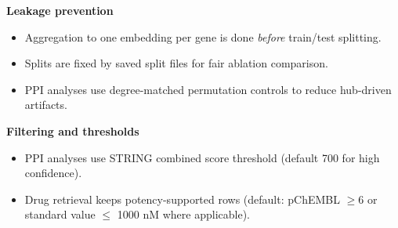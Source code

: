\documentclass{article}
\begin{document}
\textbf{Leakage prevention}
\begin{itemize}
    \item Aggregation to one embedding per gene is done \emph{before} train/test splitting.
    \item Splits are fixed by saved split files for fair ablation comparison.
    \item PPI analyses use degree-matched permutation controls to reduce hub-driven artifacts.
\end{itemize}

\textbf{Filtering and thresholds}
\begin{itemize}
    \item PPI analyses use STRING combined score threshold (default 700 for high confidence).
    \item Drug retrieval keeps potency-supported rows (default: pChEMBL $\geq 6$ or standard value $\leq$ 1000 nM where applicable).
\end{itemize}
\end{document}
